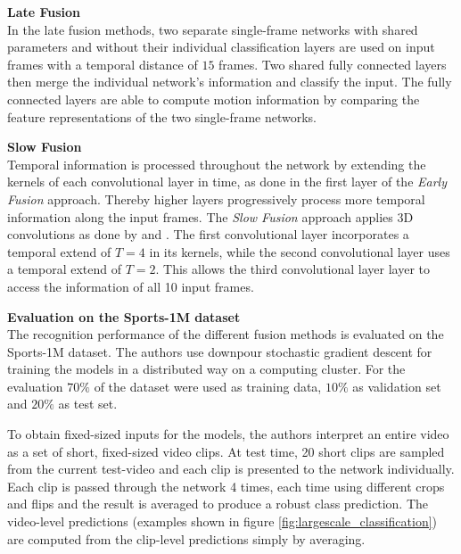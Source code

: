 \textbf{Late Fusion}\\
In the late fusion methods, two separate single-frame networks with shared parameters and without their individual classification layers are used on input frames with a temporal distance of $15$ frames.
Two shared fully connected layers then merge the individual network's information and classify the input. 
The fully connected layers are able to compute motion information by comparing the feature representations of the two single-frame networks.

\textbf{Slow Fusion}\\
Temporal information is processed throughout the network by extending the kernels of each convolutional layer in time, as done in the first layer of the \textit{Early Fusion} approach.
Thereby higher layers progressively process more temporal information along the input frames.
The \textit{Slow Fusion} approach applies 3D convolutions as done by \textcite{ji_3d_2013} and \textcite{baccouche_sequential_2011}.
The first convolutional layer incorporates a temporal extend of $T = 4$ in its kernels, while the second convolutional layer uses a temporal extend of $T = 2$.
This allows the third convolutional layer layer to access the information of all 10 input frames.

\textbf{Evaluation on the Sports-1M dataset}\\
The recognition performance of the different fusion methods is evaluated on the Sports-1M dataset.
The authors use downpour stochastic gradient descent \cite{dean_large_2012} for training the models in a distributed way on a computing cluster.
For the evaluation $70\%$ of the dataset were used as training data, $10\%$ as validation set and $20\%$ as test set.

To obtain fixed-sized inputs for the models, the authors interpret an entire video as a set of short, fixed-sized video clips.
At test time, 20 short clips are sampled from the current test-video and each clip is presented to the network individually.
Each clip is passed through the network 4 times, each time using different crops and flips and the result is averaged to produce a robust class prediction.
The video-level predictions (examples shown in figure \ref{fig:largescale_classification}) are computed from the clip-level predictions simply by averaging.

